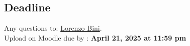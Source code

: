 \subsection*{Deadline}
Any questions to: \href{mailto:Lorenzo.Bini@unige.ch}{Lorenzo Bini}.\\
Upload on Moodle due by : \textbf{April 21, 2025 at 11:59 pm}
